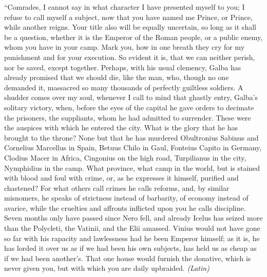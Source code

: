 
``Comrades, I cannot say in what character I have presented myself to you; I refuse to call myself a subject, now that you have named me Prince, or Prince, while another reigns. Your title also will be equally uncertain, so long as it shall be a question, whether it is the Emperor of the Roman people, or a public enemy, whom you have in your camp. Mark you, how in one breath they cry for my punishment and for your execution. So evident it is, that we can neither perish, nor be saved, except together. Perhaps, with his usual clemency, Galba has already promised that we should die, like the man, who, though no one demanded it, massacred so many thousands of perfectly guiltless soldiers. A shudder comes over my soul, whenever I call to mind that ghastly entry, Galba's solitary victory, when, before the eyes of the capital he gave orders to decimate the prisoners, the suppliants, whom he had admitted to surrender. These were the auspices with which he entered the city. What is the glory that he has brought to the throne? None but that he has murdered Obultronius Sabinus and Cornelius Marcellus in Spain, Betuus Chilo in Gaul, Fonteius Capito in Germany, Clodius Macer in Africa, Cingonius on the high road, Turpilianus in the city, Nymphidius in the camp. What province, what camp in the world, but is stained with blood and foul with crime, or, as he expresses it himself, purified and chastened? For what others call crimes he calls reforms, and, by similar misnomers, he speaks of strictness instead of barbarity, of economy instead of avarice, while the cruelties and affronts inflicted upon you he calls discipline. Seven months only have passed since Nero fell, and already Icelus has seized more than the Polycleti, the Vatinii, and the Elii amassed. Vinius would not have gone so far with his rapacity and lawlessness had he been Emperor himself; as it is, he has lorded it over us as if we had been his own subjects, has held us as cheap as if we had been another's. That one house would furnish the donative, which is never given you, but with which you are daily upbraided. \emph{(Latin)}



